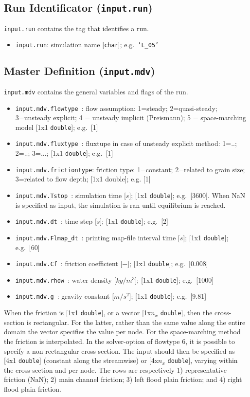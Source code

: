 \documentclass[a4paper, 11pt]{article}
\begin{document}
\subsection{Run Identificator (\texttt{input.run})}
\label{subsubsec:in_run}
%
\texttt{input.run} contains the tag that identifies a run.
\begin{itemize}
\item \texttt{input.run}: simulation name [\texttt{char}]; e.g.\ \texttt{'L\_05'}
\end{itemize}
%
\subsection{Master Definition (\texttt{input.mdv})}
\label{subsubsec:in_mdv}
%
\texttt{input.mdv} contains the general variables and flags of the run.
\begin{itemize}
\item \texttt{input.mdv.flowtype    }: flow assumption: 1=steady; 2=quasi-steady; 3=unsteady explicit; 4 = unsteady implicit (Preismann); 5 = space-marching model [1x1 \texttt{double}]; e.g.\ [1]
\item \texttt{input.mdv.fluxtype    }: fluxtupe in case of unsteady explicit method: 1=..; 2=..; 3=...; [1x1 \texttt{double}]; e.g.\ [1]
\item \texttt{input.mdv.frictiontype}: friction type: 1=constant; 2=related to grain size; 3=related to flow depth; [1x1 double]; e.g. [1]
\item \texttt{input.mdv.Tstop       }: simulation time [$s$]; [1x1 \texttt{double}]; e.g.\ [3600]. When NaN is specified as input, the simulation is ran until equilibrium is reached. 
\item \texttt{input.mdv.dt          }: time step [$s$]; [1x1 \texttt{double}]; e.g.\ [2]
\item \texttt{input.mdv.Flmap\_dt   }: printing map-file interval time [$s$]; [1x1 \texttt{double}]; e.g.\ [60]   
\item \texttt{input.mdv.Cf          }: friction coefficient [$-$]; [1x1 \texttt{double}]; e.g.\ [0.008]
\item \texttt{input.mdv.rhow        }: water density [$kg/m^3$]; [1x1 \texttt{double}]; e.g.\ [1000]
\item \texttt{input.mdv.g           }: gravity constant [$m/s^2$]; [1x1 \texttt{double}]; e.g.\ [9.81]
\end{itemize}
When the friction is [1x1 \texttt{double}], or  a vector [1x$n_x$ \texttt{double}], then the cross-section is rectangular. For the latter, rather than the same value along the entire domain the vector specifies the value per node. For the space-marching method the friction is interpolated.  In the solver-option of flowtype 6, it is possible to specify a non-rectangular cross-section. The input should then be specified as [4x1 \texttt{double}] (constant along the streamwise) or   [4x$n_x$ \texttt{double}], varying within the cross-section and per node. The rows are respectively 1) representative friction (NaN); 2) main channel friction; 3) left flood plain friction; and 4) right flood plain friction.
\end{document}
